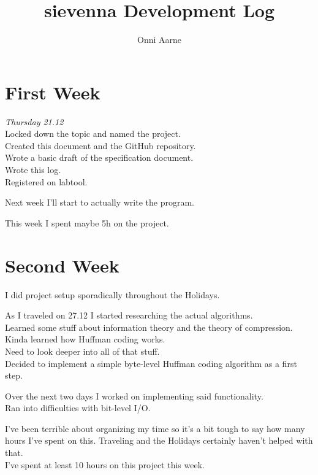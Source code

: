 \documentclass[11pt,a4paper,oneside,notitlepage,final]{article}
\begin{document}
	
	\setlength{\abovedisplayskip}{8.0pt plus3.0pt minus4.0pt}
	\setlength{\abovedisplayshortskip}{0.0pt plus3.0pt}
	\setlength{\belowdisplayskip}{8.0pt plus3.0pt minus4.0pt}
	\setlength{\belowdisplayshortskip}{7.0pt plus3.0pt minus3.0pt}
	
	\title{sievenna Development Log}
	\author{Onni Aarne}
	\maketitle
	
	\section{First Week}
	\emph{Thursday 21.12} \\
	Locked down the topic and named the project.\\
	Created this document and the GitHub repository.\\
	Wrote a basic draft of the specification document.\\
	Wrote this log.\\
	Registered on labtool.
	
	Next week I'll start to actually write the program.
	
	This week I spent maybe 5h on the project.
	
	\section{Second Week}
	I did project setup sporadically throughout the Holidays.
	
	As I traveled on 27.12 I started researching the actual algorithms.\\
	Learned some stuff about information theory and the theory of compression.\\
	Kinda learned how Huffman coding works.\\
	Need to look deeper into all of that stuff.\\
	Decided to implement a simple byte-level Huffman coding algorithm as a first step.
	
	Over the next two days I worked on implementing said functionality.\\
	Ran into difficulties with bit-level I/O.

	I've been terrible about organizing my time so it's a bit tough to say how many hours I've spent on this. Traveling and the Holidays certainly haven't helped with that.\\
	I've spent at least 10 hours on this project this week.
	
\end{document}
